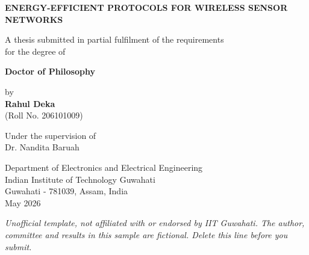 \begin{titlepage}
\centering
\begin{singlespace}
\vspace*{0.4in}
{\large\bfseries\MakeUppercase{Energy-Efficient Protocols for Wireless Sensor Networks}\par}
\vspace{0.8in}
A thesis submitted in partial fulfilment of the requirements\\
for the degree of\par\vspace{0.2in}
{\bfseries Doctor of Philosophy}\par\vspace{0.3in}
by\\
{\bfseries Rahul Deka}\\
(Roll No. 206101009)\par\vspace{0.3in}
Under the supervision of\\
Dr. Nandita Baruah\par\vspace{0.6in}
Department of Electronics and Electrical Engineering\\
Indian Institute of Technology Guwahati\\
Guwahati - 781039, Assam, India\\
May 2026
\end{singlespace}
\vfill
{\footnotesize\itshape Unofficial template, not affiliated with or endorsed by IIT Guwahati. The author, committee and results in this sample are fictional. Delete this line before you submit.}
\end{titlepage}
